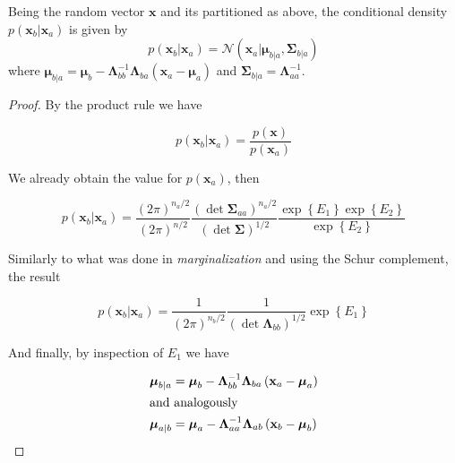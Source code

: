 \begin{appendices}
  \begin{theorem}[Conditioning]
    \label{theorem:app-gau-condit}
    Being the random vector $\mathbf{x}$ and its partitioned as above, the conditional density $p(\mathbf{x}_b | \mathbf{x}_a)$ is given by
    \begin{displaymath}
      p(\mathbf{x}_b | \mathbf{x}_a) = \mathcal{N}\left( \mathbf{x}_a | \boldsymbol{\mu}_{b|a}, \boldsymbol{\Sigma}_{b|a} \right)
    \end{displaymath}
    where $\boldsymbol{\mu}_{b|a} = \boldsymbol{\mu}_{b}-\boldsymbol{\Lambda}_{b b}^{-1} \boldsymbol{\Lambda}_{b a}\left(\mathbf{x}_{a}-\boldsymbol{\mu}_{a}\right)$ and $\boldsymbol{\Sigma}_{b|a} = \boldsymbol{\Lambda}_{aa}^{-1}$.
  \end{theorem}

  \begin{proof}
    By the product rule we have

    \begin{equation}
      p(\mathbf{x}_b|\mathbf{x}_a)=\frac{p(\mathbf{x})}{p(\mathbf{x}_a)}
    \end{equation}

    We already obtain the value for $p(\mathbf{x}_a)$, then

    \begin{equation}
      p(\mathbf{x}_b|\mathbf{x}_a)=\frac{(2 \pi )^{n_a/2}}{\left( 2 \pi \right)^{n/2}} \frac{( \det \mathbf{\Sigma}_{aa} )^{n_a/2}}{\left( \det \boldsymbol{\Sigma} \right)^{1/2}} \frac{\exp \left\{ E_1 \right\} \exp \left\{ E_2 \right\}}{\exp \left\{ E_2 \right\}}
    \end{equation}
    
    Similarly to what was done in \textit{marginalization} and using the Schur complement, the result

    \begin{equation}
      p(\mathbf{x}_b|\mathbf{x}_a)=\frac{1}{\left( 2 \pi \right)^{n_b/2}} \frac{1}{\left( \det \boldsymbol{\Lambda}_{bb} \right)^{1/2}} \exp \left\{ E_1 \right\}
    \end{equation}

    And finally, by inspection of $E_1$ we have

    \begin{subequations}
      \begin{align}
        \boldsymbol{\mu}_{b|a} &=  \boldsymbol{\mu}_{b}-\boldsymbol{\Lambda}_{b b}^{-1} \boldsymbol{\Lambda}_{b a}\left(\mathbf{x}_{a}-\boldsymbol{\mu}_{a}\right) \\
        \intertext{and analogously}
        \boldsymbol{\mu}_{a|b} &=  \boldsymbol{\mu}_{a}-\boldsymbol{\Lambda}_{a a}^{-1} \boldsymbol{\Lambda}_{a b}\left(\mathbf{x}_{b}-\boldsymbol{\mu}_{b}\right)
      \end{align}
    \end{subequations}


\end{proof}
\end{appendices}
